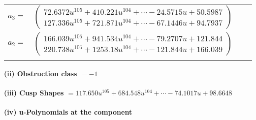 \documentclass[1p]{elsarticle_modified}
\theoremstyle{definition}
\begin{document}
\begin{tabular}{m{7pt} m{180pt} m{7pt} m{180pt} }
\flushright $a_{3}=$&$\begin{pmatrix}72.6372 u^{105}+410.221 u^{104}+\cdots-24.5715 u+50.5987\\127.336 u^{105}+721.871 u^{104}+\cdots-67.1446 u+94.7937\end{pmatrix}$ \\
\flushright $a_{2}=$&$\begin{pmatrix}166.039 u^{105}+941.534 u^{104}+\cdots-79.2707 u+121.844\\220.738 u^{105}+1253.18 u^{104}+\cdots-121.844 u+166.039\end{pmatrix}$\\&\end{tabular}
\flushleft \textbf{(ii) Obstruction class $= -1$}\\~\\
\flushleft \textbf{(iii) Cusp Shapes $= 117.650 u^{105}+684.548 u^{104}+\cdots-74.1017 u+98.6648$}\\~\\
\newpage\renewcommand{\arraystretch}{1}
\flushleft \textbf{(iv) u-Polynomials at the component}\newline \\
\end{document}

